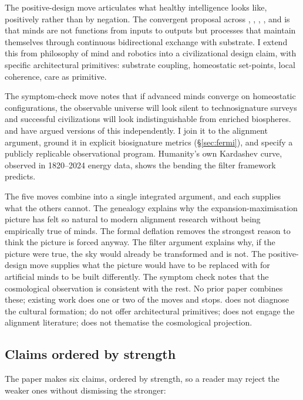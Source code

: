 \documentclass[11pt,a4paper,twocolumn]{article}
\begin{document}
The positive-design move articulates what healthy intelligence looks
like, positively rather than by negation. The convergent proposal
across \citet{man2019}, \citet{thompson2007}, \citet{froese2009},
\citet{cannon2022}, and \citet{pihlakas2024} is that minds are not
functions from inputs to outputs but processes that maintain
themselves through continuous bidirectional exchange with substrate.
I extend this from philosophy of mind and robotics into a
civilizational design claim, with specific architectural primitives:
substrate coupling, homeostatic set-points, local coherence, care as
primitive.

The symptom-check move notes that if advanced minds converge on
homeostatic configurations, the observable universe will look silent
to technosignature surveys and successful civilizations will look
indistinguishable from enriched biospheres. \citet{cirkovic2018} and
\citet{sandberg2018} have argued versions of this independently. I
join it to the alignment argument, ground it in explicit biosignature
metrics (\S\ref{sec:fermi}), and specify a publicly replicable
observational program. Humanity's own Kardashev curve, observed in
1820--2024 energy data, shows the bending the filter framework
predicts.

The five moves combine into a single integrated argument, and each
supplies what the others cannot. The genealogy explains why the
expansion-maximisation picture has felt so natural to modern alignment
research without being empirically true of minds. The formal deflation
removes the strongest reason to think the picture is forced anyway.
The filter argument explains why, if the picture were true, the sky
would already be transformed and is not. The positive-design move
supplies what the picture would have to be replaced with for
artificial minds to be built differently. The symptom check notes
that the cosmological observation is consistent with the rest. No
prior paper combines these; existing work does one or two of the
moves and stops. \citet{man2019} does not diagnose the cultural
formation; \citet{gebru2024} do not offer architectural primitives;
\citet{cirkovic2018} does not engage the alignment literature;
\citet{muller2022} does not thematise the cosmological projection.

\subsection{Claims ordered by strength}

The paper makes six claims, ordered by strength, so a reader may
reject the weaker ones without dismissing the stronger:
\end{document}
